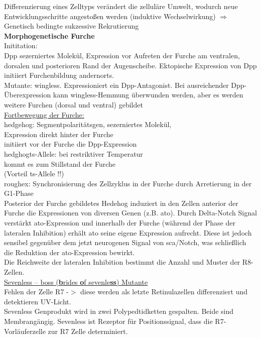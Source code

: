 Differenzierung eines Zelltyps verändert die zelluläre Umwelt, wodurch neue Entwicklungsschritte angestoßen werden (induktive Wechselwirkung) $\Rightarrow$
Genetisch bedingte sukzessive Rekrutierung\\

\textbf{Morphogenetische Furche}\\
Inititation:\\
Dpp sezerniertes Molekül, Expression vor Aufreten der Furche am ventralen, dorsalen und posterioren Rand der Augenscheibe. Ektopische Expression von Dpp initiiert Furchenbildung andernorts.\\

Mutante: wingless. Expressioniert ein Dpp-Antagonist. Bei ausreichender Dpp-Überexpression kann wingless-Hemmung überwunden werden, aber es werden weitere Furchen (dorsal und ventral) gebildet\\

\underline{Fortbewegung der Furche:}\\
hedgehog: Segmentpolaritätsgen, sezerniertes Molekül,\\
Expression direkt hinter der Furche\\
initiiert vor der Furche die Dpp-Expression\\
hedghogts-Allele: bei restriktiver Temperatur\\
kommt es zum Stillstand der Furche\\
(Vorteil ts-Allele !!)\\
roughex: Synchronisierung des Zellzyklus in der Furche durch Arretierung in der G1-Phase\\
Posterior der Furche gebildetes Hedehog induziert in den Zellen anterior der Furche die Expressionen von diversen Genen (z.B. ato). Durch Delta-Notch Signal verstärkt ato-Expression und innerhalb der Furche (während der Phase der lateralen Inhibition) erhält ato seine eigene Expression aufrecht. Diese ist jedoch sensibel gegenüber dem jetzt neurogenen Signal von sca/Notch, was schließlich die Reduktion der ato-Expression bewirkt.\\

Die Reichweite der lateralen Inhibition bestimmt die Anzahl und Muster der R8-Zellen.\\

\underline{Sevenless – boss (\textbf{b}rides \textbf{o}f sevenle\textbf{ss}) Mutante}\\
Fehlen der Zelle R7 -$>$ diese werden als letzte Retinulazellen differenziert und detektieren UV-Licht.\\
Sevenless Genprodukt wird in zwei Polypedtidketten gespalten. Beide sind Membrangängig. Sevenless ist Rezeptor für Positionssignal, dass die R7-Vorläuferzelle zur R7 Zelle determiniert.\\

